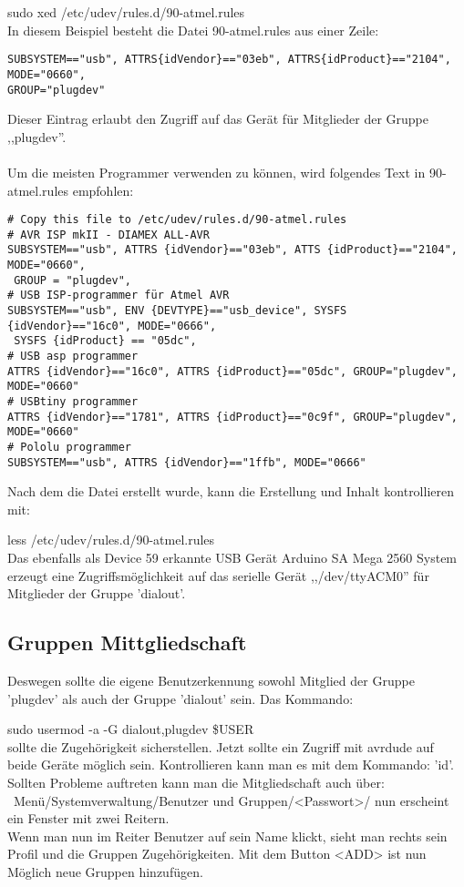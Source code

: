 sudo xed /etc/udev/rules.d/90-atmel.rules\\
In diesem Beispiel besteht die Datei 90-atmel.rules aus einer Zeile:
\begin{footnotesize}
\begin{verbatim}
SUBSYSTEM=="usb", ATTRS{idVendor}=="03eb", ATTRS{idProduct}=="2104", MODE="0660",
GROUP="plugdev"
\end{verbatim}
\end{footnotesize}
Dieser Eintrag erlaubt den Zugriff auf das Gerät für Mitglieder der Gruppe ,,plugdev''.\\
~\\
Um die meisten Programmer verwenden zu können, wird folgendes Text in 90-atmel.rules empfohlen:
\begin{footnotesize}
\begin{verbatim}
# Copy this file to /etc/udev/rules.d/90-atmel.rules
# AVR ISP mkII - DIAMEX ALL-AVR
SUBSYSTEM=="usb", ATTRS {idVendor}=="03eb", ATTS {idProduct}=="2104", MODE="0660", 
 GROUP = "plugdev",
# USB ISP-programmer für Atmel AVR
SUBSYSTEM=="usb", ENV {DEVTYPE}=="usb_device", SYSFS {idVendor}=="16c0", MODE="0666",
 SYSFS {idProduct} == "05dc",
# USB asp programmer
ATTRS {idVendor}=="16c0", ATTRS {idProduct}=="05dc", GROUP="plugdev", MODE="0660"
# USBtiny programmer
ATTRS {idVendor}=="1781", ATTRS {idProduct}=="0c9f", GROUP="plugdev", MODE="0660"
# Pololu programmer
SUBSYSTEM=="usb", ATTRS {idVendor}=="1ffb", MODE="0666"
\end{verbatim}
\end{footnotesize}
Nach dem die Datei erstellt wurde, kann die Erstellung und Inhalt kontrollieren mit:

less /etc/udev/rules.d/90-atmel.rules\\ 
Das ebenfalls als Device 59 erkannte USB Gerät  Arduino SA Mega 2560 System erzeugt eine
Zugriffsmöglichkeit auf das serielle Gerät ,,/dev/ttyACM0'' für Mitglieder der Gruppe 'dialout'.

\subsection{Gruppen Mittgliedschaft}

Deswegen sollte die eigene Benutzerkennung sowohl Mitglied der Gruppe 'plugdev' als auch
der Gruppe 'dialout' sein. Das Kommando:

sudo usermod -a -G dialout,plugdev \$USER\\
sollte die Zugehörigkeit sicherstellen. 
Jetzt sollte ein Zugriff mit avrdude auf beide Geräte möglich sein.
Kontrollieren kann man es mit dem Kommando: 'id'. \\
Sollten Probleme auftreten kann man die Mitgliedschaft auch über:\\
~Menü/Systemverwaltung/Benutzer und Gruppen/<Passwort>/ nun erscheint ein Fenster mit zwei Reitern.\\
Wenn man nun im Reiter Benutzer auf sein Name klickt, sieht man rechts sein Profil und die Gruppen Zugehörigkeiten. Mit dem Button <ADD> ist nun Möglich neue Gruppen hinzufügen.

